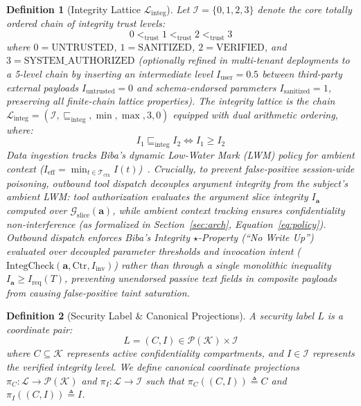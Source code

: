 \documentclass[conference,10pt]{IEEEtran}
\newtheorem{definition}{Definition}
\begin{document}
\begin{definition}[Integrity Lattice $\mathcal{L}_{\text{integ}}$]
Let $\mathcal{I} = \{0, 1, 2, 3\}$ denote the core totally ordered chain of integrity trust levels:
\begin{equation}
0 <_{\text{trust}} 1 <_{\text{trust}} 2 <_{\text{trust}} 3
\end{equation}
where $0 = \text{UNTRUSTED}$, $1 = \text{SANITIZED}$, $2 = \text{VERIFIED}$, and $3 = \text{SYSTEM\_AUTHORIZED}$ (optionally refined in multi-tenant deployments to a 5-level chain by inserting an intermediate level $I_{\text{user}} = 0.5$ between third-party external payloads $I_{\text{untrusted}} = 0$ and schema-endorsed parameters $I_{\text{sanitized}} = 1$, preserving all finite-chain lattice properties). The integrity lattice is the chain $\mathcal{L}_{\text{integ}} = (\mathcal{I}, \sqsubseteq_{\text{integ}}, \min, \max, 3, 0)$ equipped with dual arithmetic ordering, where:
\begin{equation}
I_1 \sqsubseteq_{\text{integ}} I_2 \iff I_1 \ge I_2
\end{equation}
Data ingestion tracks Biba's dynamic Low-Water Mark (LWM) policy for ambient context ($I_{\text{eff}} = \min_{t \in \mathcal{T}_{\text{ctx}}} I(t)$)~\cite{biba1977integrity}. Crucially, to prevent false-positive session-wide poisoning, outbound tool dispatch decouples argument integrity from the subject's ambient LWM: tool authorization evaluates the argument slice integrity $I_{\mathbf{a}}$ computed over $\mathcal{G}_{\text{slice}}(\mathbf{a})$, while ambient context tracking ensures confidentiality non-interference (as formalized in Section~\ref{sec:arch}, Equation~\eqref{eq:policy}). Outbound dispatch enforces Biba's Integrity $\star$-Property (``No Write Up'') evaluated over decoupled parameter thresholds and invocation intent ($\text{IntegCheck}(\mathbf{a}, \text{Ctr}, I_{\text{inv}})$) rather than through a single monolithic inequality $I_{\mathbf{a}} \ge I_{\text{req}}(T)$, preventing unendorsed passive text fields in composite payloads from causing false-positive taint saturation.
\end{definition}

\begin{definition}[Security Label \& Canonical Projections]
A security label $L$ is a coordinate pair:
\begin{equation}
L = (C, I) \in \mathcal{P}(\mathcal{K}) \times \mathcal{I}
\end{equation}
where $C \subseteq \mathcal{K}$ represents active confidentiality compartments, and $I \in \mathcal{I}$ represents the verified integrity level. We define canonical coordinate projections $\pi_C : \mathcal{L} \to \mathcal{P}(\mathcal{K})$ and $\pi_I : \mathcal{L} \to \mathcal{I}$ such that $\pi_C((C, I)) \triangleq C$ and $\pi_I((C, I)) \triangleq I$.
\end{definition}
\end{document}

